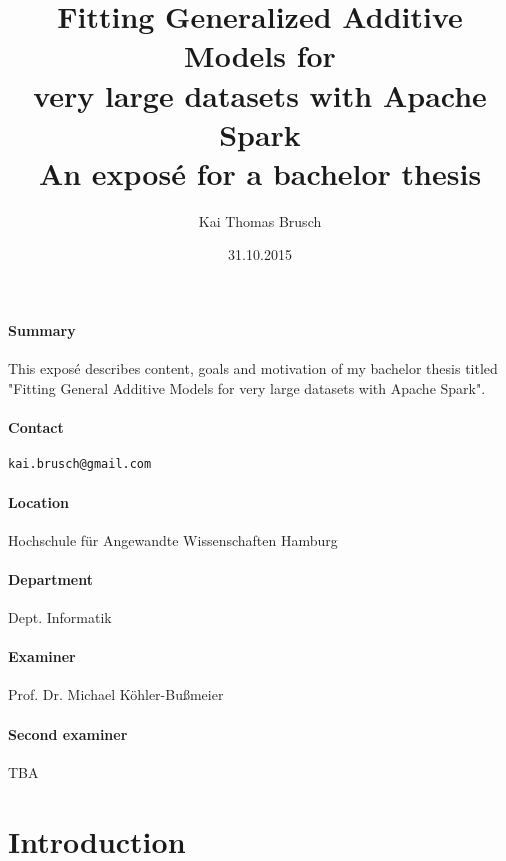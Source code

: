 \message{ !name(expose.tex)}\documentclass{article}
\title{
    Fitting Generalized Additive Models for\\ very large datasets with Apache Spark \\[7pt]
    \large An exposé for a bachelor thesis
}
\date{31.10.2015}
\author{Kai Thomas Brusch}
\begin{document}



    \maketitle

    \paragraph{Summary}

    This exposé describes content, goals and motivation of my bachelor thesis titled "Fitting General Additive Models for very large datasets with Apache Spark".

    \paragraph{Contact} \texttt{kai.brusch@gmail.com}

    \paragraph{Location} Hochschule für Angewandte Wissenschaften Hamburg
    \paragraph{Department} Dept. Informatik
    \paragraph{Examiner} Prof. Dr. Michael Köhler-Bußmeier
    \paragraph{Second examiner} TBA

    \newpage

    \tableofcontents

    \newpage

    \section{Introduction}
\end{document}

